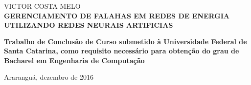 
\begin{center}

    {\large VICTOR COSTA MELO\\}
    \vspace{8cm}
    {\Large \textsc\textbf{{GERENCIAMENTO DE FALAHAS EM REDES DE ENERGIA UTILIZANDO REDES NEURAIS ARTIFICIAS} }\\}
    \vspace{1cm}
    \hspace{.45\linewidth}
    \begin{minipage}{.50\linewidth}

            \textbf{Trabalho de Conclusão de Curso submetido à Universidade Federal de Santa Catarina,  como requisito 
            necessário para obtenção do grau de Bacharel em Engenharia de Computação }

           
    
    \end{minipage}

    \vspace{2cm}
    \vfill
    {\large Araranguá, dezembro de 2016}
\end{center}